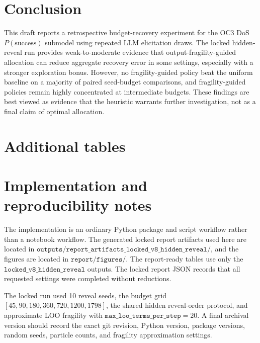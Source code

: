 \documentclass[11pt]{article}
\newcommand{\psuccess}{P(\mathrm{success})}
\begin{document}
\section{Conclusion}

This draft reports a retrospective budget-recovery experiment for the OC3 DoS \(\psuccess\) submodel using repeated LLM elicitation draws. The locked hidden-reveal run provides weak-to-moderate evidence that output-fragility-guided allocation can reduce aggregate recovery error in some settings, especially with a stronger exploration bonus. However, no fragility-guided policy beat the uniform baseline on a majority of paired seed-budget comparisons, and fragility-guided policies remain highly concentrated at intermediate budgets. These findings are best viewed as evidence that the heuristic warrants further investigation, not as a final claim of optimal allocation.

\appendix

\section{Additional tables}
\label{app:additional-tables}




\section{Implementation and reproducibility notes}

The implementation is an ordinary Python package and script workflow rather than a notebook workflow. The generated locked report artifacts used here are located in \(\texttt{outputs/report\_artifacts\_locked\_v8\_hidden\_reveal/}\), and the figures are located in \(\texttt{report/figures/}\). The report-ready tables use only the \(\texttt{locked\_v8\_hidden\_reveal}\) outputs. The locked report JSON records that all requested settings were completed without reductions.

The locked run used 10 reveal seeds, the budget grid \([45,90,180,360,720,1200,1798]\), the shared hidden reveal-order protocol, and approximate LOO fragility with \(\texttt{max\_loo\_terms\_per\_step}=20\). A final archival version should record the exact git revision, Python version, package versions, random seeds, particle counts, and fragility approximation settings.



\end{document}
